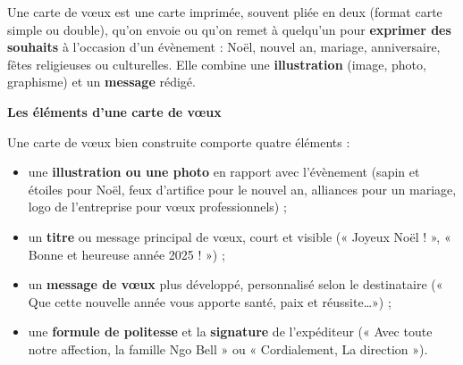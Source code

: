 \documentclass[11pt]{article}
\newcommand{\cle}[1]{{\popxbold\color{popdark}#1}}
\begin{document}
\begin{definition}
Une \cle{carte de vœux} est une carte imprimée, souvent pliée en deux (format carte simple ou double), qu'on envoie ou qu'on remet à quelqu'un pour \textbf{exprimer des souhaits} à l'occasion d'un évènement : Noël, nouvel an, mariage, anniversaire, fêtes religieuses ou culturelles. Elle combine une \textbf{illustration} (image, photo, graphisme) et un \textbf{message} rédigé.
\end{definition}

\textbf{Les éléments d'une carte de vœux}

Une carte de vœux bien construite comporte quatre éléments :

\begin{itemize}
\item une \textbf{illustration ou une photo} en rapport avec l'évènement (sapin et étoiles pour Noël, feux d'artifice pour le nouvel an, alliances pour un mariage, logo de l'entreprise pour vœux professionnels) ;
\item un \textbf{titre} ou message principal de vœux, court et visible (« Joyeux Noël ! », « Bonne et heureuse année 2025 ! ») ;
\item un \textbf{message de vœux} plus développé, personnalisé selon le destinataire (« Que cette nouvelle année vous apporte santé, paix et réussite\ldots ») ;
\item une \textbf{formule de politesse} et la \textbf{signature} de l'expéditeur (« Avec toute notre affection, la famille Ngo Bell » ou « Cordialement, La direction »).
\end{itemize}
\end{document}
